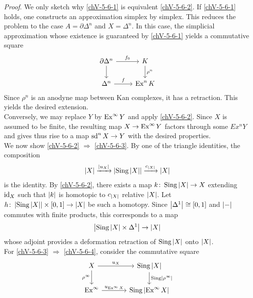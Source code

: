         \emph{Proof}. We only sketch why \ref{chV-5-6-1} is equivalent \ref{chV-5-6-2}. If \ref{chV-5-6-1} holds, one constructs an approximation simplex by simplex. This reduces the problem to the case $A = \partial \Delta^n$ and $X = \Delta^n$. In this case, the simplicial approximation whose existence is guaranteed by \ref{chV-5-6-1} yields a commutative square
        \begin{equation*}
            \begin{tikzcd}
                \partial \Delta^n \arrow[d] \arrow[r, "f_0"] & K \arrow[d, "\rho^n"] \\
                \Delta^n \arrow[r, "f"] & \Ex^n K
            \end{tikzcd}
        \end{equation*}
        Since $\rho^n$ is an anodyne map between Kan complexes, it has a retraction. This yields the desired extension.\\
        Conversely, we may replace $Y$ by $\operatorname{Ex}^{\infty} Y$ and apply \ref{chV-5-6-2}. Since $X$ is assumed to be finite, the resulting map $X \to \operatorname{Ex}^{\infty} Y$ factors through some $Ex^n Y$ and gives thus rise to a map $\operatorname{sd}^n X \to Y$ with the desired properties.\\
        We now show \ref{chV-5-6-2} $\Rightarrow$ \ref{chV-5-6-3}. By one of the triangle identities, the composition
        \begin{equation*}
            \left| X \right| \xrightarrow{\left| u_X \right|} \left| \operatorname{Sing} \left| X \right| \right| \xrightarrow{c_{\left| X \right|}} \left| X \right|
        \end{equation*}
        is the identity. By \ref{chV-5-6-2}, there exists a map $k \colon \operatorname{Sing} \left| X \right| \to X$ extending $\operatorname{id}_X$ such that $\left| k \right|$ is homotopic to $c_{\left| X \right|}$ relative $\left| X \right|$. Let $h \colon \left| \operatorname{Sing} \left| X \right| \right| \times [0, 1] \to \left| X \right|$ be such a homotopy. Since $\left| \Delta^1 \right| \cong [0, 1]$ and $\left| - \right|$ commutes with finite products, this corresponds to a map
        \begin{equation*}
            \left| \operatorname{Sing} \left| X \right| \times \Delta^1 \right| \to \left| X \right|
        \end{equation*}
        whose adjoint provides a deformation retraction of $\operatorname{Sing} \left| X \right|$ onto $\left| X \right|$.\\
        For \ref{chV-5-6-3} $\Rightarrow$ \ref{chV-5-6-4}, consider the commutative square
        \begin{equation*}
            \begin{tikzcd}[column sep=large]
                X \arrow[d, "\rho^{\infty}"'] \arrow[r, "u_X"] & \Sing \gr{X} \arrow[d, "\Sing \gr{\rho^{\infty}}"] \\
                \Ex^{\infty} \arrow[r, "u_{\Ex^{\infty} X}"] & \Sing \gr{\Ex^{\infty} X}
            \end{tikzcd}
        \end{equation*}
